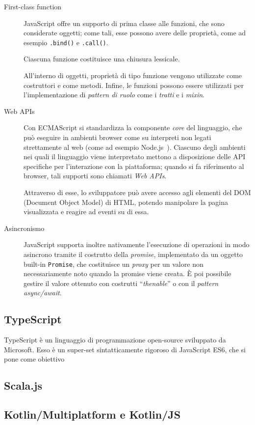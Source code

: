 \begin{description}
      \item[First-class function]
        JavaScript offre un supporto di prima classe alle funzioni, che sono considerate oggetti;
        come tali, esse possono avere delle proprietà, come ad esempio \texttt{.bind()} e \texttt{.call()}. %

        Ciascuna funzione costituisce una chiusura lessicale.

        All'interno di oggetti, proprietà di tipo funzione vengono utilizzate come costruttori e come metodi.
        Infine, le funzioni possono essere utilizzati per l'implementazione di \emph{pattern di ruolo} come i \emph{tratti} e i \emph{mixin}.

      \item[Web APIs]
        Con ECMAScript si standardizza la componente \emph{core} del linguaggio, che può eseguire in ambienti browser come su interpreti non legati strettamente al web (come ad esempio Node.js~\cite{5617064}).
        Ciascuno degli ambienti nei quali il linguaggio viene interpretato mettono a disposizione delle API specifiche per l'interazione con la piattaforma;
        quando si fa riferimento al browser, tali supporti sono chiamati \emph{Web APIs}.

        Attraverso di esse, lo sviluppatore può avere accesso agli elementi del DOM (Document Object Model) di HTML, potendo manipolare la pagina visualizzata e reagire ad eventi su di essa.

      \item[Asincronismo]
        JavaScript supporta inoltre nativamente l'esecuzione di operazioni in modo asincrono tramite il costrutto della \emph{promise}, implementato da un oggetto built-in \texttt{Promise},
        che costituisce un \emph{proxy} per un valore non necessariamente noto quando la promise viene creata.
        È poi possibile gestire il valore ottenuto con costrutti ``\emph{thenable}'' o con il \emph{pattern async/await}.
    \end{description}

    \subsection{TypeScript}\label{subsec:ts}
    TypeScript è un linguaggio di programmazione open-source sviluppato da Microsoft.
    Esso è un super-set sintatticamente rigoroso di JavaScript ES6, che si pone come obiettivo %



    \subsection{Scala.js}
    \subsection{Kotlin/Multiplatform e Kotlin/JS}
